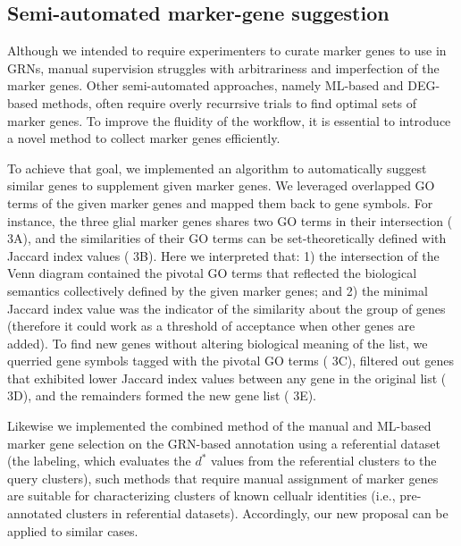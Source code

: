 \documentclass{article}
\begin{document}
\subsection*{Semi-automated marker-gene suggestion}
Although we intended to require experimenters to curate marker genes to use in GRNs, manual supervision struggles 
with arbitrariness and imperfection of the marker genes. Other semi-automated approaches, namely ML-based and 
DEG-based methods, often require overly recurrsive trials to find optimal sets of marker genes. To improve the 
fluidity of the workflow, it is essential to introduce a novel method to collect marker genes efficiently.

To achieve that goal, we implemented an algorithm to automatically suggest similar genes to supplement given 
marker genes. We leveraged overlapped GO terms of the given marker genes and mapped them back to gene 
symbols. For instance, the three glial marker genes shares two GO terms in their intersection (\figurename{ 3A}), and the 
similarities of their GO terms can be set-theoretically defined with Jaccard index values (\figurename{ 3B}). Here we 
interpreted that: 1) the intersection of the Venn diagram contained the pivotal GO terms that reflected the biological 
semantics collectively defined by the given marker genes; and 2) the minimal Jaccard index value was the 
indicator of the similarity about the group of genes (therefore it could work as a threshold of acceptance 
when other genes are added). To find new genes without altering biological meaning of the list, we querried gene symbols 
tagged with the pivotal GO terms (\figurename{ 3C}), filtered out genes that exhibited lower Jaccard index values between 
any gene in the original list (\figurename{ 3D}), and the remainders formed the new gene list (\figurename{ 3E}).

Likewise we implemented the combined method of the manual and ML-based marker gene selection on the 
GRN-based annotation using a referential dataset (the labeling, which evaluates the $d^*$ values from the referential 
clusters to the query clusters), such methods that require manual assignment of marker genes are suitable for characterizing 
clusters of known cellualr identities (i.e., pre-annotated clusters in referential datasets). Accordingly, 
our new proposal can be applied to similar cases.
\end{document}
